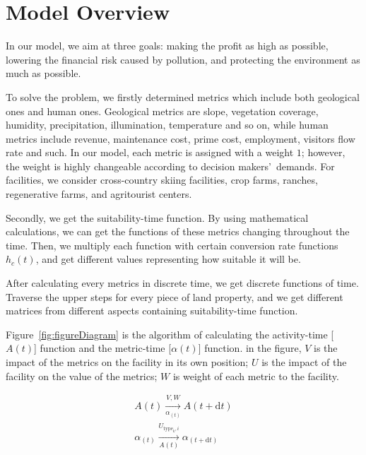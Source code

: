 \documentclass[./main.tex]{subfiles}
\begin{document}
    \section{Model Overview}
    In our model, we aim at three goals: making the profit as high as possible, lowering the financial risk caused by
    pollution, and protecting the environment as much as possible.

    To solve the problem, we firstly determined metrics which include both geological ones and human ones.
    Geological metrics are slope, vegetation coverage, humidity, precipitation, illumination, temperature and so on,
    while human metrics include revenue, maintenance cost, prime cost, employment, visitors flow rate and such.
    In our model, each metric is assigned with a weight $1$; however, the weight is highly changeable according to
    decision makers\rq\ demands.
    For facilities, we consider cross-country skiing facilities, crop farms, ranches, regenerative farms, and
    agritourist centers.

    Secondly, we get the suitability-time function.
    By using mathematical calculations, we can get the functions of these metrics changing throughout the time.
    Then, we multiply each function with certain conversion rate functions $h_c \left( t \right)$, and get different
    values representing how suitable it will be.

    After calculating every metrics in discrete time, we get discrete functions of time.
    Traverse the upper steps for every piece of land property, and we get different matrices from different aspects
    containing suitability-time function.

    Figure~\ref{fig:figureDiagram} is the algorithm of calculating the activity-time [$A\left(t\right)$] function and
    the metric-time [$\alpha\left(t\right)$] function.
    in the figure, $V$ is the impact of the metrics on the facility in its own position; $U$ is the impact of the
    facility on the value of the metrics; $W$ is weight of each metric to the facility.

    \begin{gather*}
        A\left( t \right)\xrightarrow[\alpha_{\left( t \right)}]{V, W}A\left( t+\mathrm{d}t \right)\\
        \alpha_{\left( t \right)}\xrightarrow[A\left( t \right)]{U_{\mathrm{type}_k, i}}\alpha_{\left( t+\mathrm{d}t
        \right)}\\
    \end{gather*}
\end{document}
